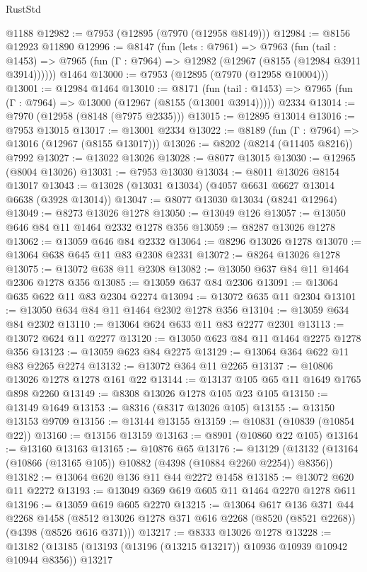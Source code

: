 \begin{lexlean}{RustStd}
\begin{coremodule}
    @1188
@12982 := @7953 (@12895 (@7970 (@12958 @8149)))
@12984 := @8156 @12923 @11890
@12996 := @8147
    (fun (lets : @7961) =>
    @7963
      (fun (tail : @1453) =>
      @7965 (fun (Γ : @7964) => @12982 (@12967 (@8155 (@12984 @3911 @3914))))))
    @1464
@13000 := @7953 (@12895 (@7970 (@12958 @10004)))
@13001 := @12984 @1464
@13010 := @8171
    (fun (tail : @1453) => @7965 (fun (Γ : @7964) => @13000 (@12967 (@8155 (@13001 @3914)))))
    @2334
@13014 := @7970 (@12958 (@8148 (@7975 @2335)))
@13015 := @12895 @13014
@13016 := @7953 @13015
@13017 := @13001 @2334
@13022 := @8189 (fun (Γ : @7964) => @13016 (@12967 (@8155 @13017)))
@13026 := @8202 (@8214 (@11405 @8216)) @7992
@13027 := @13022 @13026
@13028 := @8077 @13015
@13030 := @12965 (@8004 @13026)
@13031 := @7953 @13030
@13034 := @8011 @13026 @8154 @13017
@13043 := @13028 (@13031 @13034) (@4057 @6631 @6627 @13014 @6638 (@3928 @13014))
@13047 := @8077 @13030 @13034 (@8241 @12964)
@13049 := @8273 @13026 @1278
@13050 := @13049 @126
@13057 := @13050 @646 @84 @11 @1464 @2332 @1278 @356
@13059 := @8287 @13026 @1278
@13062 := @13059 @646 @84 @2332
@13064 := @8296 @13026 @1278
@13070 := @13064 @638 @645 @11 @83 @2308 @2331
@13072 := @8264 @13026 @1278
@13075 := @13072 @638 @11 @2308
@13082 := @13050 @637 @84 @11 @1464 @2306 @1278 @356
@13085 := @13059 @637 @84 @2306
@13091 := @13064 @635 @622 @11 @83 @2304 @2274
@13094 := @13072 @635 @11 @2304
@13101 := @13050 @634 @84 @11 @1464 @2302 @1278 @356
@13104 := @13059 @634 @84 @2302
@13110 := @13064 @624 @633 @11 @83 @2277 @2301
@13113 := @13072 @624 @11 @2277
@13120 := @13050 @623 @84 @11 @1464 @2275 @1278 @356
@13123 := @13059 @623 @84 @2275
@13129 := @13064 @364 @622 @11 @83 @2265 @2274
@13132 := @13072 @364 @11 @2265
@13137 := @10806 @13026 @1278 @1278 @161 @22
@13144 := @13137 @105 @65 @11 @1649 @1765 @898 @2260
@13149 := @8308 @13026 @1278 @105 @23 @105
@13150 := @13149 @1649
@13153 := @8316 (@8317 @13026 @105)
@13155 := @13150 @13153 @9709
@13156 := @13144 @13155
@13159 := @10831 (@10839 (@10854 @22))
@13160 := @13156 @13159
@13163 := @8901 (@10860 @22 @105)
@13164 := @13160 @13163
@13165 := @10876 @65
@13176 := @13129 (@13132 (@13164 (@10866 (@13165 @105)) @10882 (@4398 (@10884 @2260 @2254)) @8356))
@13182 := @13064 @620 @136 @11 @44 @2272 @1458
@13185 := @13072 @620 @11 @2272
@13193 := @13049 @369 @619 @605 @11 @1464 @2270 @1278 @611
@13196 := @13059 @619 @605 @2270
@13215 := @13064
    @617
    @136
    @371
    @44
    @2268
    @1458
    (@8512 @13026 @1278 @371 @616 @2268 (@8520 (@8521 @2268)) (@4398 (@8526 @616 @371)))
@13217 := @8333 @13026 @1278
@13228 := @13182 (@13185 (@13193 (@13196 (@13215 @13217)) @10936 @10939 @10942 @10944 @8356)) @13217

\end{coremodule}
\end{lexlean}
